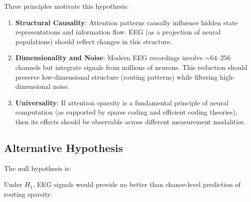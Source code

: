 Three principles motivate this hypothesis:

\begin{enumerate}
    \item \textbf{Structural Causality}: Attention patterns causally influence hidden state representations and information flow. EEG (as a projection of neural populations) should reflect changes in this structure.
    
    \item \textbf{Dimensionality and Noise}: Modern EEG recordings involve $\sim 64$--$256$ channels but integrate signals from millions of neurons. This reduction should preserve low-dimensional structure (routing patterns) while filtering high-dimensional noise.
    
    \item \textbf{Universality}: If attention sparsity is a fundamental principle of neural computation (as supported by sparse coding and efficient coding theories), then its effects should be observable across different measurement modalities.
\end{enumerate}

\subsection{Alternative Hypothesis}

The null hypothesis is:

\begin{center}
\end{center}

Under $H_1$, EEG signals would provide no better than chance-level prediction of routing sparsity.
